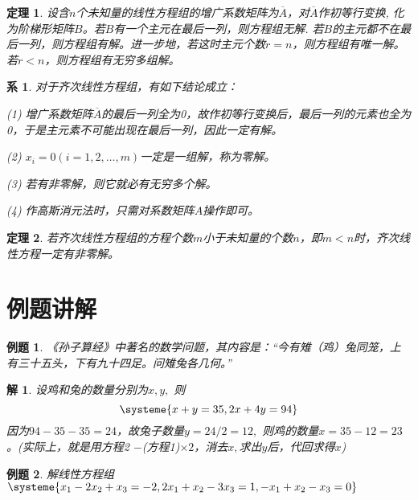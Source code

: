 \documentclass[a4paper]{book}
\newtheorem{cor}{系}[chapter]
\newtheorem{thm}{定理}[chapter]
\newtheorem{eg}{例题}[chapter]
\newtheorem*{solution}{解}
\newcommand{\enum}{\begin{list}{}{\setlength{\leftmargin}{0pt} \setlength{\itemindent}{2.5em} \setlength{\listparindent}{2em}}}
\begin{document}
\begin{thm}
设含$n$个未知量的线性方程组的增广系数矩阵为$\overline{A}$，对$\overline{A}$作初等行变换, 化为阶梯形矩阵$B$。若$B$有一个主元在最后一列，则方程组无解. 若$B$的主元都不在最后一列，则方程组有解。进一步地，若这时主元个数$r=n$，则方程组有唯一解。若$r<n$，则方程组有无穷多组解。
\end{thm}

\begin{cor}
对于齐次线性方程组，有如下结论成立：

\enum
\item[(1)]增广系数矩阵$\overline{A}$的最后一列全为0，故作初等行变换后，最后一列的元素也全为0，于是主元素不可能出现在最后一列，因此一定有解。
\item[(2)]$x_i=0 (i=1,2,…,m)$一定是一组解，称为零解。
\item[(3)]若有非零解，则它就必有无穷多个解。
\item[(4)]作高斯消元法时，只需对系数矩阵$A$操作即可。
\end{list}
\end{cor}

\begin{thm}
若齐次线性方程组的方程个数$m$小于未知量的个数$n$，即$m<n$时，齐次线性方程一定有非零解。
\end{thm}


\section{例题讲解}

\begin{eg}
《孙子算经》中著名的数学问题，其内容是：“今有雉（鸡）兔同笼，上有三十五头，下有九十四足。问雉兔各几何。”
\end{eg}
\begin{solution}
设鸡和兔的数量分别为$x, y,$  则
$$\systeme{ x + y = 35, 2x + 4y = 94}$$
因为$94-35-35=24$，故兔子数量$y=24/2=12,$ 则鸡的数量$x=35-12=23$。(实际上，就是用方程2 $-$(方程1)$\times 2$，消去$x,$求出$y$后，代回求得$x$)
\end{solution}

\vspace{1.5em}

\begin{eg}
解线性方程组
$\systeme{x_1 - 2x_2 + x_3 = -2 , 2x_1 + x_2 - 3x_3 = 1 , -x_1 + x_2 - x_3 = 0}$
\end{eg}
\end{document}
